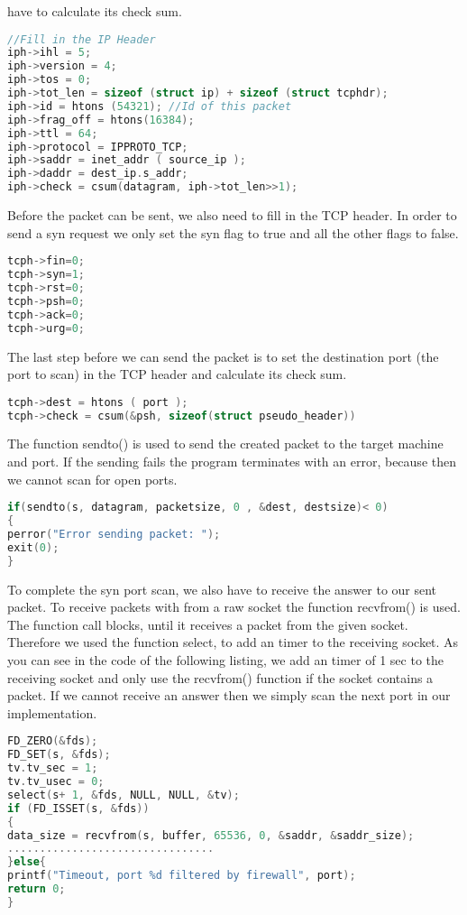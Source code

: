 have to calculate its check sum.
\begin{lstlisting}[frame= single, language=C, caption= C code to fill in ip header]
//Fill in the IP Header
iph->ihl = 5;
iph->version = 4;
iph->tos = 0;
iph->tot_len = sizeof (struct ip) + sizeof (struct tcphdr);
iph->id = htons (54321); //Id of this packet
iph->frag_off = htons(16384);
iph->ttl = 64;
iph->protocol = IPPROTO_TCP;
iph->saddr = inet_addr ( source_ip );   
iph->daddr = dest_ip.s_addr;
iph->check = csum(datagram, iph->tot_len>>1);
\end{lstlisting}
Before the packet can be sent, we also need to fill in the TCP header. In order to send a syn request we only set the syn flag to true and all the other flags to false.
\begin{lstlisting}[frame= single, language=C, caption= C code to set flags in TCP header]
tcph->fin=0;
tcph->syn=1;
tcph->rst=0;
tcph->psh=0;
tcph->ack=0;
tcph->urg=0;
\end{lstlisting}
The last step before we can send the packet is to set the destination port (the port to scan)  in the TCP header and calculate its check sum.
\begin{lstlisting}[frame= single, language=C, caption= C code to set port and calculate checksum in TCP header]
tcph->dest = htons ( port );
tcph->check = csum(&psh, sizeof(struct pseudo_header))
\end{lstlisting}
The function sendto() is used to send the created packet to the target machine and port. If the sending fails the program terminates with
an error, because then we cannot scan for open ports.
\begin{lstlisting}[frame= single, language=C, caption= C code to set port and calculate checksum in TCP header]
if(sendto(s, datagram, packetsize, 0 , &dest, destsize)< 0)
{
perror("Error sending packet: ");
exit(0);
}
\end{lstlisting}
To complete the syn port scan, we also have to receive the answer to our sent packet. To receive packets with from a raw socket the function recvfrom() is used. The function call blocks, until it
receives a packet from the given socket. Therefore we used the function select, to add an timer to the receiving socket. As you can see in the code of the following listing, we add an timer of 1 sec
to the receiving socket and only use the recvfrom() function if the socket contains a packet. If we cannot receive an answer then we simply scan the next port in our implementation.
\begin{lstlisting}[frame= single, language=C, caption= C code to receive the packet]
FD_ZERO(&fds);
FD_SET(s, &fds);
tv.tv_sec = 1;
tv.tv_usec = 0;
select(s+ 1, &fds, NULL, NULL, &tv);		
if (FD_ISSET(s, &fds))
{
data_size = recvfrom(s, buffer, 65536, 0, &saddr, &saddr_size);
................................
}else{
printf("Timeout, port %d filtered by firewall", port);
return 0;
}
\end{lstlisting}

